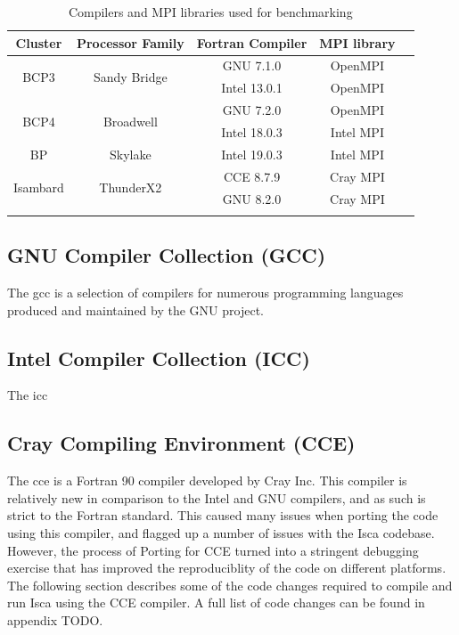 \documentclass[a4paper,11pt]{report}
\begin{document}
\begin{table}[htp]
\caption{Compilers and MPI libraries used for benchmarking}
\begin{center}
\begin{tabular}{c c c c c}
 \toprule

\textbf{Cluster} 			&	\textbf{Processor Family}		&	\textbf{Fortran Compiler}		&	\textbf{MPI library}	 \\
\midrule
\multirow{2}{*}{BCP3} 	&	\multirow{2}{*}{Sandy Bridge}	&	GNU 7.1.0 			&	OpenMPI	 \\
					& 							& 	Intel 13.0.1			&	OpenMPI			\\
\midrule	
\multirow{2}{*}{BCP4}	&	\multirow{2}{*}{Broadwell}		&	GNU 7.2.0			&	OpenMPI			\\
	&											&	Intel 18.0.3			&	Intel MPI			\\
\midrule	
BP					&	Skylake					&	Intel 19.0.3 			&	Intel MPI			\\
\midrule			
\multirow{2}{*}{Isambard}	&	\multirow{2}{*}{ThunderX2}	&	CCE 8.7.9				&	Cray MPI			\\
					&							&	GNU 8.2.0			&	Cray MPI			\\
\bottomrule \\
\end{tabular}
\end{center}
\label{tbl:compilers}
\end{table}%

\subsection{GNU Compiler Collection (GCC)}
The \gls{gcc} is a selection of compilers for numerous programming languages produced and maintained by the GNU project. 

\subsection{Intel Compiler Collection (ICC)}
The \gls{icc}


\subsection{Cray Compiling Environment (CCE)}
The \gls{cce} is a Fortran 90 compiler developed by Cray Inc. This compiler is relatively new in comparison to the Intel and GNU compilers, and as such is strict to the Fortran standard. This caused many issues when porting the code using this compiler, and flagged up a number of issues with the Isca codebase. However, the process of Porting for CCE turned into a stringent debugging exercise that has improved the reproduciblity of the code on different platforms. The following section describes some of the code changes required to compile and run Isca using the CCE compiler. A full list of code changes can be found in appendix TODO.
\end{document}
